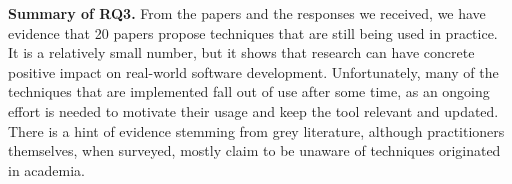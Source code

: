 \begin{tcolorbox}%
\textbf{Summary of RQ3.} From the papers and the responses we received, we have evidence that 20 papers propose techniques that are still being used in practice.
It is a relatively small number, but it shows that \rt research can have concrete positive impact on real-world software development.
Unfortunately, many of the techniques that are implemented fall out of use after some time, as an ongoing effort is needed to motivate their usage and keep the tool relevant and updated.
There is a hint of evidence stemming from grey literature, although practitioners themselves, when surveyed, mostly claim to be unaware of \rt techniques originated in academia.
\end{tcolorbox}
